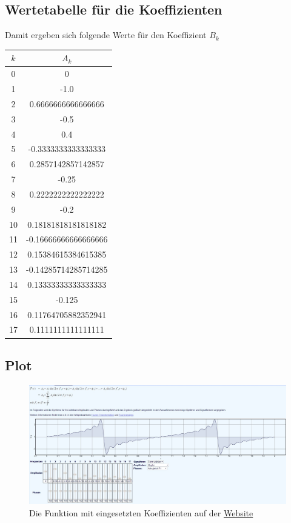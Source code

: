 \subsection{Wertetabelle für die Koeffizienten}
Damit ergeben sich folgende Werte für den Koeffizient $B_k$
\begin{table}
  \centering
  \label{tab:koeffizienten}
  \begin{tabular}{c c}
    \toprule
    $k$ & $A_k$\\
    \midrule
    0 &0 \\
    1 &-1.0 \\
    2 &0.6666666666666666\\
    3 &-0.5\\
    4 &0.4\\
    5 &-0.3333333333333333\\
    6 &0.2857142857142857\\
    7 &-0.25\\
    8 &0.2222222222222222\\
    9 &-0.2\\
    10 &0.18181818181818182\\
    11 &-0.16666666666666666\\
    12 &0.15384615384615385\\
    13 &-0.14285714285714285\\
    14 &0.13333333333333333\\
    15 &-0.125\\
    16 &0.11764705882352941\\
    17 & 0.1111111111111111 \\
    \bottomrule
  \end{tabular}
\end{table}
\newpage
\subsection{Plot}
\begin{figure}
  \centering
  \includegraphics[width=\textwidth]{content/Fourier_x.png}
  \caption{Die Funktion mit eingesetzten Koeffizienten auf der \href{https://www.j-berkemeier.de/Fouriersynthese.html}{Website}}
  \label{fig:f(x)=x}
\end{figure}


